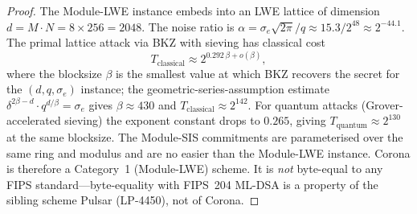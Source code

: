 \begin{proof}
The Module-LWE instance embeds into an LWE lattice of dimension $d = M \cdot N = 8 \times 256 = 2048$.
The noise ratio is $\alpha = \sigma_e \sqrt{2\pi} / q \approx 15.3 / 2^{48} \approx 2^{-44.1}$.
The primal lattice attack via BKZ with sieving has classical cost
\[
T_{\text{classical}} \approx 2^{0.292\,\beta + o(\beta)},
\]
where the blocksize $\beta$ is the smallest value at which BKZ recovers the secret for the
$(d, q, \sigma_e)$ instance; the geometric-series-assumption estimate
$\delta^{2\beta - d} \cdot q^{d/\beta} = \sigma_e$ gives $\beta \approx 430$ and
$T_{\text{classical}} \approx 2^{142}$. For quantum attacks (Grover-accelerated sieving)
the exponent constant drops to $0.265$, giving $T_{\text{quantum}} \approx 2^{130}$ at the
same blocksize. The Module-SIS commitments are parameterised over the same ring and
modulus and are no easier than the Module-LWE instance. Corona is therefore a Category~1
(Module-LWE) scheme. It is \emph{not} byte-equal to any FIPS standard---byte-equality with
FIPS~204 ML-DSA is a property of the sibling scheme Pulsar (LP-4450), not of Corona.
\end{proof}

